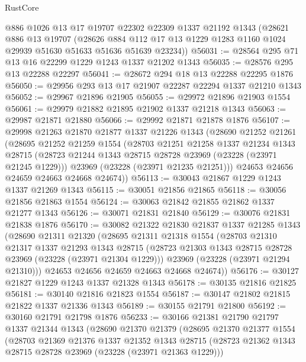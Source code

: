 \begin{lexlean}{RustCore}
\begin{coremodule}
    @886
    @1026
    @13
    @17
    @19707
    @22302
    @22309
    @1337
    @21192
    @1343
    (@28621
      @886
      @13
      @19707
      (@28626 @884 @112 @17 @13 @1229 @1283 @1160 @1024 @29939 @51630 @51633 @51636 @51639 @23234))
@56031 := @28564 @295 @71 @13 @16 @22299 @1229 @1243 @1337 @21202 @1343
@56035 := @28576 @295 @13 @22288 @22297
@56041 := @28672 @294 @18 @13 @22288 @22295 @1876
@56050 := @29956 @293 @13 @17 @21907 @22287 @22294 @1337 @21210 @1343
@56052 := @29967 @21896 @21905
@56055 := @29972 @21896 @21903 @1554
@56061 := @29979 @21882 @21895 @21902 @1337 @21218 @1343
@56063 := @29987 @21871 @21880
@56066 := @29992 @21871 @21878 @1876
@56107 := @29998
    @21263
    @21870
    @21877
    @1337
    @21226
    @1343
    (@28690
      @21252
      @21261
      (@28695
        @21252
        @21259
        @1554
        (@28703
          @21251
          @21258
          @1337
          @21234
          @1343
          @28715
          (@28723 @21244 @1343 @28715 @28728 @23969 (@23228 (@23971 @21245 @1229)))
          @23969
          (@23228 (@23971 @21235 @21251)))
        @24653
        @24656
        @24659
        @24663
        @24668
        @24674))
@56113 := @30043 @21867 @1229 @1243 @1337 @21269 @1343
@56115 := @30051 @21856 @21865
@56118 := @30056 @21856 @21863 @1554
@56124 := @30063 @21842 @21855 @21862 @1337 @21277 @1343
@56126 := @30071 @21831 @21840
@56129 := @30076 @21831 @21838 @1876
@56170 := @30082
    @21322
    @21830
    @21837
    @1337
    @21285
    @1343
    (@28690
      @21311
      @21320
      (@28695
        @21311
        @21318
        @1554
        (@28703
          @21310
          @21317
          @1337
          @21293
          @1343
          @28715
          (@28723 @21303 @1343 @28715 @28728 @23969 (@23228 (@23971 @21304 @1229)))
          @23969
          (@23228 (@23971 @21294 @21310)))
        @24653
        @24656
        @24659
        @24663
        @24668
        @24674))
@56176 := @30127 @21827 @1229 @1243 @1337 @21328 @1343
@56178 := @30135 @21816 @21825
@56181 := @30140 @21816 @21823 @1554
@56187 := @30147 @21802 @21815 @21822 @1337 @21336 @1343
@56189 := @30155 @21791 @21800
@56192 := @30160 @21791 @21798 @1876
@56233 := @30166
    @21381
    @21790
    @21797
    @1337
    @21344
    @1343
    (@28690
      @21370
      @21379
      (@28695
        @21370
        @21377
        @1554
        (@28703
          @21369
          @21376
          @1337
          @21352
          @1343
          @28715
          (@28723 @21362 @1343 @28715 @28728 @23969 (@23228 (@23971 @21363 @1229)))

\end{coremodule}
\end{lexlean}
